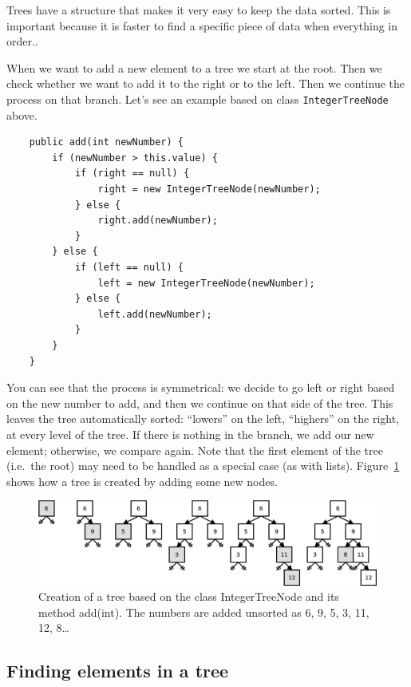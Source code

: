 Trees have a structure that makes it very easy to keep the data
sorted. This is important because it is faster to find a specific
piece of data when everything in order.. 

When we want to add a new element to a tree we start at the root. Then
we check whether we want to add it to the right or to the left. Then
we continue the process on that branch. Let's see an example based on 
class \verb+IntegerTreeNode+ above.

\begin{verbatim}
    public add(int newNumber) {
        if (newNumber > this.value) {
            if (right == null) {
                right = new IntegerTreeNode(newNumber);
            } else {
                right.add(newNumber);
            }
        } else {
            if (left == null) {
                left = new IntegerTreeNode(newNumber);
            } else {
                left.add(newNumber);
            }
        }            
    }
\end{verbatim}

You can see that the process is symmetrical: we decide to go left or
right based on the new number to add, and then we continue on that
side of the tree. This leaves the tree automatically sorted: ``lowers''
on the left, ``highers'' on the right, at every level of the tree. If
there is nothing in the branch, we add our new element; otherwise, we
compare again. 
Note that the first element of the tree (i.e.~the
root) may need to be handled as a special case (as with
lists). Figure~\ref{fig:treecr} shows how a tree is created by adding
some new nodes. 

\begin{figure}[hbtp]
  \centering
  \includegraphics[width=\textwidth]{gfx/tree-creation}
  \caption{Creation of a tree based on the class IntegerTreeNode and
    its method add(int). The numbers are added unsorted as 6, 9, 5, 3,
    11, 12, 8\ldots} 
  \label{fig:treecr}
\end{figure}

\subsection{Finding elements in a tree}
\label{sec:find-elem-tree}

